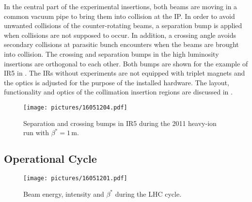 In the central part of the experimental insertions, both beams are moving in a common vacuum pipe to bring them into collision at the IP. In order to avoid unwanted collisions of the counter-rotating beams, a separation bump is applied when collisions are not supposed to occur. In addition, a crossing angle avoids secondary collisions at parasitic bunch encounters when the beams are brought into collision.  The crossing and separation bumps in the high luminosity insertions are orthogonal to each other. Both bumps are shown for the example of IR5 in . The IRs without experiments are not equipped with triplet magnets and the optics is adjusted for the purpose of the installed hardware. The layout, functionality and optics of the collimation insertion regions are discussed in . 




%
%
%
\begin{figure}[htbp]  
    \centering
    \texttt{[image: pictures/16051204.pdf]}
    \caption{Separation and crossing bumps in IR5 during the 2011 heavy-ion run with $\beta^*=1\,$m.}  
    \label{pic:16051204}
\end{figure}
%
%


\subsection{Operational Cycle} \label{chap:lhccycle}
% 
\begin{figure}[b]  
    \centering
    \texttt{[image: pictures/16051201.pdf]}
    \caption{Beam energy, intensity and $\beta^*$ during the LHC cycle.}  
    \label{pic:16040801}
\end{figure}
%

